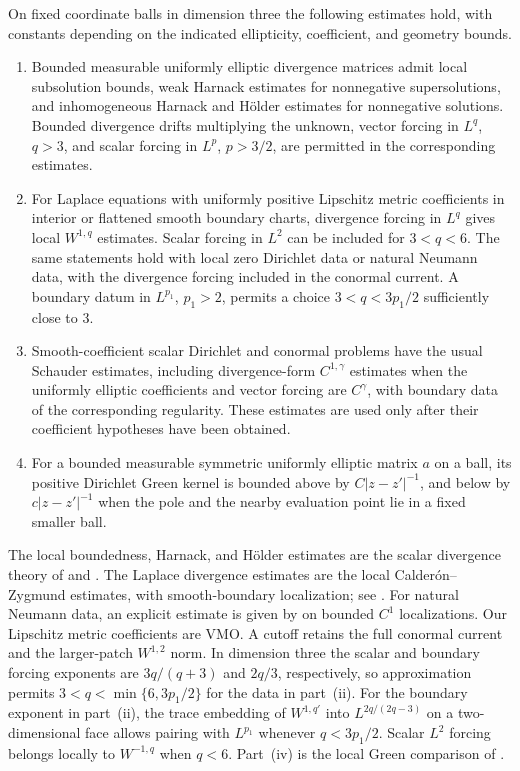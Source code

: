 \begin{proposition}\label{prop:elliptic-inputs}
On fixed coordinate balls in dimension three the following estimates
hold, with constants depending on the indicated ellipticity,
coefficient, and geometry bounds.
\begin{enumerate}[label=\textup{(\roman*)}]
\item Bounded measurable uniformly elliptic divergence matrices admit
local subsolution bounds, weak Harnack estimates for nonnegative
supersolutions, and inhomogeneous Harnack and H\"older estimates for
nonnegative solutions. Bounded divergence drifts multiplying the
unknown, vector forcing in $L^q$, $q>3$, and scalar forcing in $L^p$,
$p>3/2$, are permitted in the corresponding estimates.
\item For Laplace equations with uniformly positive Lipschitz metric
coefficients in interior or flattened smooth boundary charts,
divergence forcing in $L^q$ gives local $W^{1,q}$ estimates.
Scalar forcing in $L^2$ can be included for $3<q<6$.
The same statements hold with local zero Dirichlet data or natural
Neumann data, with the divergence forcing included in the conormal
current. A boundary datum in $L^{p_1}$, $p_1>2$, permits a choice
$3<q<3p_1/2$ sufficiently close to $3$.
\item Smooth-coefficient scalar Dirichlet and conormal problems have
the usual Schauder estimates, including divergence-form
$C^{1,\gamma}$ estimates when the uniformly elliptic coefficients
and vector forcing are $C^\gamma$, with boundary data of the
corresponding regularity. These estimates are used only after their
coefficient hypotheses have been obtained.
\item For a bounded measurable symmetric uniformly elliptic matrix
$a$ on a ball, its positive Dirichlet Green kernel is bounded above
by $C|z-z'|^{-1}$, and below by $c|z-z'|^{-1}$ when the pole and
the nearby evaluation point lie in a fixed smaller ball.
\end{enumerate}
\end{proposition}

The local boundedness, Harnack, and H\"older estimates are the scalar
divergence theory of \citet{Serrin1964} and
\citet[Chapter 8]{GT2001}. The Laplace divergence estimates are the
local Calder\'on--Zygmund estimates, with smooth-boundary
localization; see \citet{Stein1970,GT2001}.
For natural Neumann data, an explicit estimate is given by
\citet[Appendix, proof of Lemma 6.1, (6.2), p.\ 19
of arXiv v3]{ChoiKim2013} on bounded $C^1$ localizations.
Our Lipschitz metric coefficients are VMO. A cutoff retains the
full conormal current and the larger-patch $W^{1,2}$ norm.
In dimension three the scalar and boundary forcing exponents are
$3q/(q+3)$ and $2q/3$, respectively, so approximation permits
$3<q<\min\{6,3p_1/2\}$ for the data in part~(ii).
For the boundary exponent in part~(ii), the trace embedding of
$W^{1,q'}$ into $L^{2q/(2q-3)}$ on a two-dimensional face allows
pairing with $L^{p_1}$ whenever $q<3p_1/2$.
Scalar $L^2$ forcing belongs locally to $W^{-1,q}$ when $q<6$.
Part~(iv) is the local Green comparison of
\citet[Theorem 7.1 and the discussion on pp.\ 66--67]{LSW1963}.

